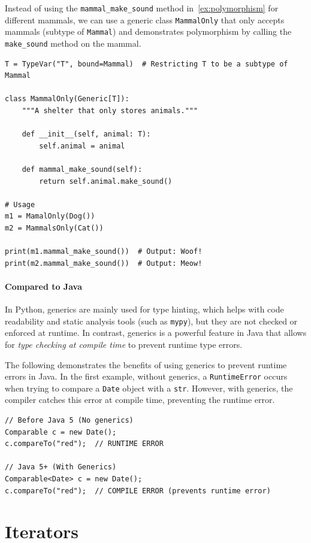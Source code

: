 \documentclass[oneside,11pt,dvipsnames]{book}
\newcommand{\code}[1]{\texttt{#1}}
\begin{document}
Instead of using the \code{mammal\_make\_sound} method in~\autoref{ex:polymorphism} for different mammals, 
we can use a generic class \code{MammalOnly} that only accepts mammals (subtype of \code{Mammal}) and demonstrates polymorphism by calling the \code{make\_sound} method on the mammal.


\begin{lstlisting}
T = TypeVar("T", bound=Mammal)  # Restricting T to be a subtype of Mammal

class MammalOnly(Generic[T]):
    """A shelter that only stores animals."""
    
    def __init__(self, animal: T):
        self.animal = animal

    def mammal_make_sound(self):
        return self.animal.make_sound()

# Usage
m1 = MamalOnly(Dog())
m2 = MammalsOnly(Cat())

print(m1.mammal_make_sound())  # Output: Woof!
print(m2.mammal_make_sound())  # Output: Meow!
\end{lstlisting}


\paragraph{Compared to Java}

In Python, generics are mainly used for type hinting, which helps with code readability and static analysis tools (such as \texttt{mypy}), but they are not checked or enforced at runtime. 
In contrast, generics is a powerful feature in Java that allows for \emph{type checking at compile time} to prevent runtime type errors. 

The following demonstrates the benefits of using generics to prevent runtime errors in Java. In the first example, without generics, a \code{RuntimeError} occurs when trying to compare a \code{Date} object with a \code{str}. However, with generics, the compiler catches this error at compile time, preventing the runtime error.

\begin{lstlisting}
// Before Java 5 (No generics)
Comparable c = new Date();
c.compareTo("red");  // RUNTIME ERROR

// Java 5+ (With Generics)
Comparable<Date> c = new Date();
c.compareTo("red");  // COMPILE ERROR (prevents runtime error)
\end{lstlisting}

\section{Iterators}\label{sec:iterators-generators}
\end{document}
